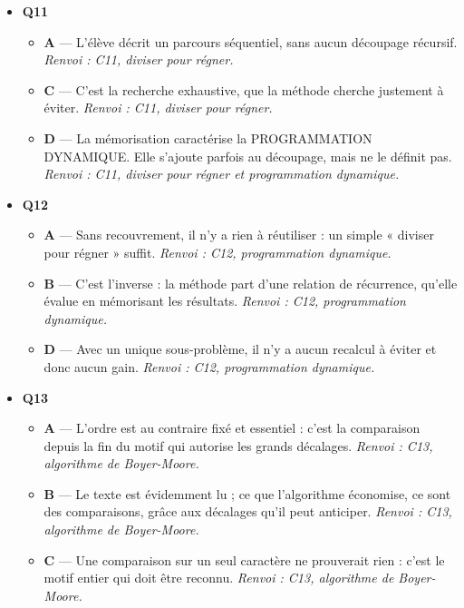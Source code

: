 \begin{itemize}
\begin{itemize}
    \item \textbf{D} — L'ordre de visite mêle toutes les branches explorées ; il ne distingue pas celles qui mènent au but de celles qui ont été abandonnées. \emph{Renvoi : C10, reconstitution d'un chemin.}
  \end{itemize}
  \item \textbf{Q11}
  \begin{itemize}
    \item \textbf{A} — L'élève décrit un parcours séquentiel, sans aucun découpage récursif. \emph{Renvoi : C11, diviser pour régner.}
    \item \textbf{C} — C'est la recherche exhaustive, que la méthode cherche justement à éviter. \emph{Renvoi : C11, diviser pour régner.}
    \item \textbf{D} — La mémorisation caractérise la PROGRAMMATION DYNAMIQUE. Elle s'ajoute parfois au découpage, mais ne le définit pas. \emph{Renvoi : C11, diviser pour régner et programmation dynamique.}
  \end{itemize}
  \item \textbf{Q12}
  \begin{itemize}
    \item \textbf{A} — Sans recouvrement, il n'y a rien à réutiliser : un simple « diviser pour régner » suffit. \emph{Renvoi : C12, programmation dynamique.}
    \item \textbf{B} — C'est l'inverse : la méthode part d'une relation de récurrence, qu'elle évalue en mémorisant les résultats. \emph{Renvoi : C12, programmation dynamique.}
    \item \textbf{D} — Avec un unique sous-problème, il n'y a aucun recalcul à éviter et donc aucun gain. \emph{Renvoi : C12, programmation dynamique.}
  \end{itemize}
  \item \textbf{Q13}
  \begin{itemize}
    \item \textbf{A} — L'ordre est au contraire fixé et essentiel : c'est la comparaison depuis la fin du motif qui autorise les grands décalages. \emph{Renvoi : C13, algorithme de Boyer-Moore.}
    \item \textbf{B} — Le texte est évidemment lu ; ce que l'algorithme économise, ce sont des comparaisons, grâce aux décalages qu'il peut anticiper. \emph{Renvoi : C13, algorithme de Boyer-Moore.}
    \item \textbf{C} — Une comparaison sur un seul caractère ne prouverait rien : c'est le motif entier qui doit être reconnu. \emph{Renvoi : C13, algorithme de Boyer-Moore.}
  \end{itemize}
\end{itemize}
\fi
